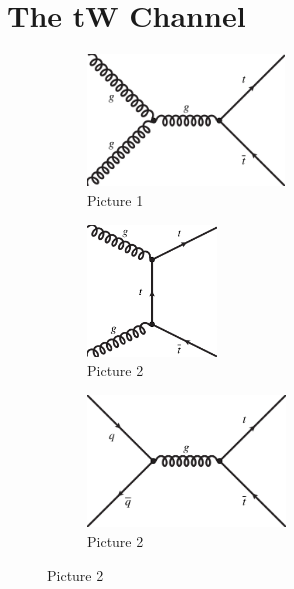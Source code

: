 \chapter{The tW Channel}
\label{chp:tw}

\begin{figure}
  \begin{subfigure}[b]{0.3\textwidth}
    \includegraphics[height=3.5cm]{figures_SM/ttbar_ttbar_1-BW}
    \caption{Picture 1}
    \label{fig:1}
  \end{subfigure}
  \hfill
  \begin{subfigure}[b]{0.3\textwidth}
    \includegraphics[height=3.5cm]{figures_SM/ttbar_ttbar_2-BW}
    \caption{Picture 2}
    \label{fig:2}
  \end{subfigure}
  \hfill
  \begin{subfigure}[b]{0.3\textwidth}
    \includegraphics[height=3.5cm]{figures_SM/ttbar_ttbar_3-BW}
    \caption{Picture 2}
    \label{fig:2}
  \end{subfigure}  
\end{figure}